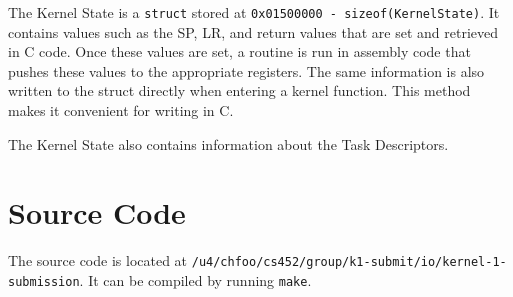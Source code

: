 \documentclass[letterpaper,12pt]{article}
\begin{document}
The Kernel State is a \texttt{struct} stored at \texttt{0x01500000 - sizeof(KernelState)}. It contains values such as the SP, LR, and return values that are set and retrieved in C code. Once these values are set, a routine is run in assembly code that pushes these values to the appropriate registers. The same information is also written to the struct directly when entering a kernel function.  This method makes it convenient for writing in C.

The Kernel State also contains information about the Task Descriptors.


\section{Source Code%
  \label{source-code}%
}

The source code is located at \texttt{/u4/chfoo/cs452/group/k1-submit/io/kernel-1-submission}. It can be compiled by running \texttt{make}.
\end{document}
